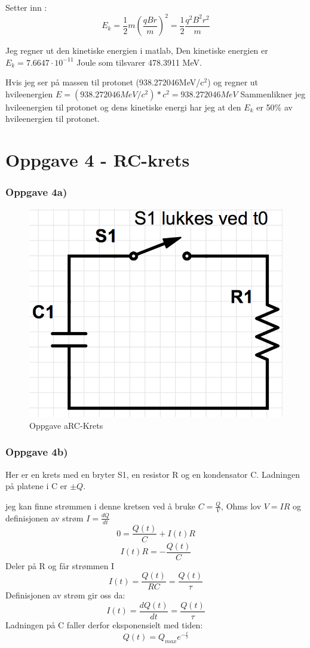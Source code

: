 \documentclass[12pt,a4paper,final,leqno]{report}
\begin{document}
Setter inn :
$$
E_k=\frac{1}{2} m (\frac{qBr}{m})^2=\frac{1}{2} \frac{q^2B^2r^2}{m}
$$

Jeg regner ut den kinetiske energien i matlab, 
Den kinetiske energien er $E_k = 7.6647 \cdot 10^{-11}$ Joule som tilsvarer 478.3911 MeV.

Hvis jeg ser på massen til protonet (938.272046MeV/c$^2$) og regner ut hvileenergien $E=(938.272046MeV/c^2)*c^2=938.272046MeV$
Sammenlikner jeg hvileenergien til protonet og dens kinetiske energi har jeg at den $E_k$ er 50\% av hvileenergien til protonet.


\chapter*{Oppgave 4 - RC-krets} 
\subsection*{Oppgave 4a)}
\begin{figure}[H]
\caption{ Oppgave aRC-Krets }
\centering
\includegraphics[width=\textwidth]{krets1.jpg}
\end{figure}
\subsection*{Oppgave 4b)}
Her er en krets med en bryter S1, en resistor R og en kondensator C. Ladningen på platene i C er $\pm Q$.

jeg kan finne strømmen i denne kretsen ved å bruke $C=\frac{Q}{V}$, Ohms lov $V=IR$ og definisjonen av strøm $I=\frac{dQ}{dt}$
$$
0=\frac{Q(t)}{C}+I(t)R
$$
$$
I(t)R=-\frac{Q(t)}{C} 
$$
Deler på R og får strømmen I
$$
I(t)=\frac{Q(t)}{RC}=\frac{Q(t)}{\tau}
$$
Definisjonen av strøm gir oss da:
$$
I(t)=\frac{dQ(t)}{dt}=\frac{Q(t)}{\tau}
$$
Ladningen på C faller derfor eksponensielt med tiden:
$$
Q(t)=Q_{max}e^{-\frac{t}{\tau}}
$$
\end{document}
